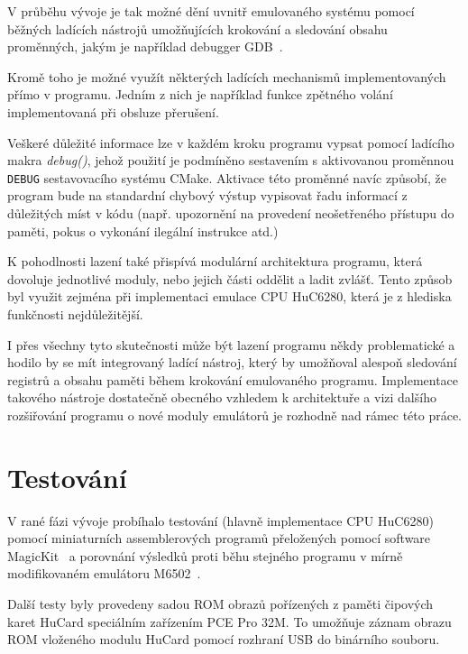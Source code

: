 V průběhu vývoje je tak možné  dění uvnitř emulovaného systému
pomocí běžných ladících nástrojů umožňujících krokování a sledování obsahu
proměnných, jakým je například debugger GDB~\cite{wwwGDB}.

Kromě toho je možné využít některých ladících mechanismů implementovaných přímo
v programu. Jedním z nich je například funkce zpětného volání implementovaná
při obsluze přerušení.

Veškeré důležité informace lze v každém kroku programu vypsat pomocí ladícího
makra {\it debug()}, jehož použití je podmíněno sestavením s aktivovanou
proměnnou {\tt DEBUG} sestavovacího systému CMake. Aktivace této proměnné navíc
způsobí, že program bude na standardní chybový výstup vypisovat řadu informací
z důležitých míst v kódu (např. upozornění na provedení neošetřeného přístupu
do paměti, pokus o vykonání ilegální instrukce atd.)

K pohodlnosti lazení také přispívá modulární architektura programu, která
dovoluje jednotlivé moduly, nebo jejich části oddělit a ladit zvlášť. Tento
způsob byl využit zejména při implementaci emulace CPU HuC6280, která je z
hlediska funkčnosti nejdůležitější.

I přes všechny tyto skutečnosti může být lazení programu někdy problematické a
hodilo by se mít integrovaný ladící nástroj, který by umožňoval alespoň
sledování registrů a obsahu paměti během krokování emulovaného programu.
Implementace takového nástroje dostatečně obecného vzhledem k architektuře a
vizi dalšího rozšiřování programu o nové moduly emulátorů je rozhodně nad rámec
této práce.


\section{Testování}\label{chap:test_results}

V rané fázi vývoje probíhalo testování (hlavně implementace CPU HuC6280) pomocí
miniaturních assemblerových programů přeložených pomocí software
MagicKit~\cite{wwwMagicKit} a porovnání výsledků proti běhu stejného programu v
mírně modifikovaném emulátoru M6502~\cite{wwwM6502}.

Další testy byly provedeny sadou ROM obrazů pořízených z paměti čipových karet
HuCard speciálním zařízením PCE Pro 32M. To umožňuje záznam obrazu ROM
vloženého modulu HuCard pomocí rozhraní USB do binárního souboru.

